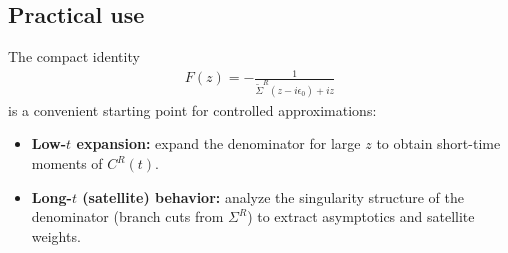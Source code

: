 \subsection*{Practical use}

The compact identity
\begin{align}
F(z)
= -\frac{1}{\tilde{\Sigma}^R(z - i\epsilon_0) + i z}
\end{align}
is a convenient starting point for controlled approximations:
\begin{itemize}
  \item \textbf{Low-$t$ expansion:} expand the denominator for large $z$
        to obtain short-time moments of $C^R(t)$.
  \item \textbf{Long-$t$ (satellite) behavior:} analyze the singularity
        structure of the denominator (branch cuts from $\Sigma^R$)
        to extract asymptotics and satellite weights.
\end{itemize}

